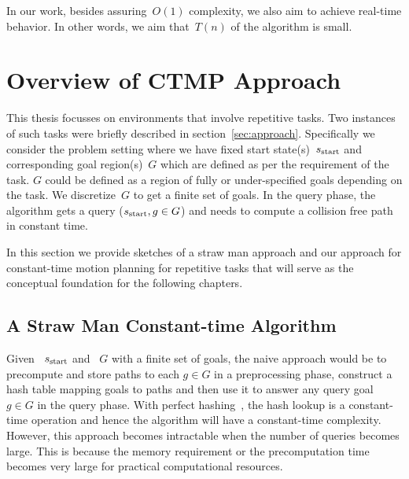 \documentclass[a4paper]{report}
\begin{document}
In our work, besides assuring~$O(1)$ complexity, we also aim to achieve real-time behavior. In other words, we aim that~$T(n)$ of the algorithm is small.

\section{Overview of CTMP Approach}
This thesis focusses on environments that involve repetitive tasks. Two instances of such tasks were briefly described in section~\ref{sec:approach}. Specifically we consider the problem setting where we have fixed start state(s)~$s_{\textrm{start}}$ and corresponding goal region(s)~$G$ which are defined as per the requirement of the task. $G$ could be defined as a region of fully or under-specified goals depending on the task. We discretize~$G$ to get a finite set of goals. In the query phase, the algorithm gets a query ($s_{\text{start}}, g \in G$) and needs to compute a collision free path in constant time.


In this section we provide sketches of a straw man approach and our approach for constant-time motion planning for repetitive tasks that will serve as the conceptual foundation for the following chapters.

\subsection{A Straw Man Constant-time Algorithm}
Given ~$s_{\text{start}}$ and ~$G$ with a finite set of goals, the naive approach would be to precompute and store paths to each $g \in G$ in a preprocessing phase, construct a hash table mapping goals to paths and then use it to answer any query goal~$g \in G$ in the query phase.
With perfect hashing~\cite{czech1997perfect}, the hash lookup is a constant-time operation and hence the algorithm will have a constant-time complexity. However, this approach becomes intractable when the number of queries becomes large. This is because the memory requirement or the precomputation time becomes very large for practical computational resources.
\end{document}
